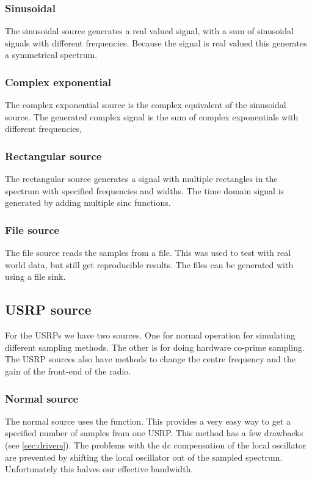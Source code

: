 \documentclass[a4paper, openany, oneside]{memoir}
\begin{document}
\subsubsection{Sinusoidal}
The sinusoidal source generates a real valued signal, with a sum of sinusoidal signals with different frequencies. Because the signal is real valued this generates a symmetrical spectrum.

\subsubsection{Complex exponential}
The complex exponential source is the complex equivalent of the sinusoidal source. The generated complex signal is the sum of complex exponentials with different frequencies,

\subsubsection{Rectangular source}
The rectangular source generates a signal with multiple rectangles in the spectrum with specified frequencies and widths. The time domain signal is generated by adding multiple sinc functions.

\subsubsection{File source}
The file source reads the samples from a file. This was used to test with real world data, but still get reproducible results. The files can be generated with  using a file sink.


\subsection{USRP source}
For the USRPs we have two sources. One for normal operation for simulating different sampling methods. The other is for doing hardware co-prime sampling. The USRP sources also have methods to change the centre frequency and the gain of the front-end of the radio.

\subsubsection{Normal source}
The normal source uses the  function. This provides a very easy way to get a specified number of samples from one USRP\@. This method has a few drawbacks (see \cref{sec:drivers}). The problems with the dc compensation of the local oscillator are prevented by shifting the local oscillator out of the sampled spectrum. Unfortunately this halves our effective bandwidth.
\end{document}
